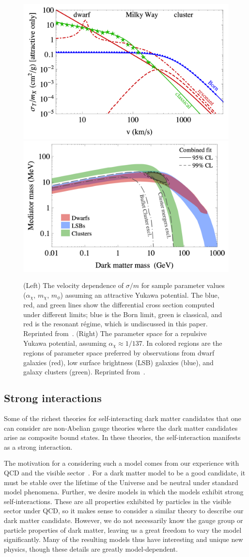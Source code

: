 \begin{figure}[t!]
    \centering
    \includegraphics[width=0.45\linewidth]{fig/sigma_vs_vel.png}
    \includegraphics[width=0.45\linewidth]{fig/yukawa_constraint.png}
    \caption{
        (Left) The velocity dependence of $\sigma/m$ for sample parameter values
        ($\alpha_\chi$, $m_\chi$, $m_\phi$) assuming an attractive Yukawa
        potential. The blue, red, and green lines show the differential cross
        section computed under different limits; blue is the Born limit,
        green is classical, and red is the resonant régime, which is
        undiscussed in this paper. Reprinted from~\cite{tulin_resonant_2013}.
        (Right) The parameter space for a repulsive Yukawa potential,
        assuming $\alpha_\chi \approx 1/137$. In colored regions are the
        regions of parameter space preferred by observations from dwarf
        galaxies (red), low surface brightness (LSB) galaxies (blue), and
        galaxy clusters (green). Reprinted from~\cite{kaplinghat_dark_2016}.
    }
    \label{fig:sidm}
\end{figure}


\subsection{Strong interactions}
Some of the richest theories for self-interacting dark matter candidates that
one can consider are non-Abelian gauge theories where the dark matter candidates
arise as composite bound states. In these theories, the self-interaction
manifests as a strong interaction.

The motivation for a considering such a model comes from our experience with QCD
and the visible sector~\cite{kribs_review_2016}. For a dark matter model to be a
good candidate, it must be stable over the lifetime of the Universe and be
neutral under standard model phenomena. Further, we desire models in which the
models exhibit strong self-interactions. These are all properties exhibited by
particles in the visible sector under QCD, so it makes sense to consider a
similar theory to describe our dark matter candidate. However, we do not
necessarily know the gauge group or particle properties of dark matter, leaving
us a great freedom to vary the model significantly. Many of the resulting models
thus have interesting and unique new physics, though these details are greatly
model-dependent.

